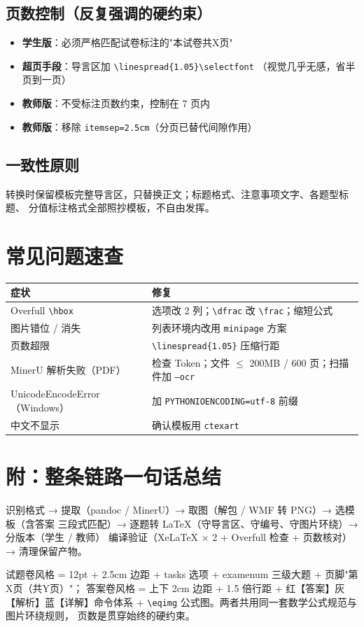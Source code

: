 \documentclass[11pt,a4paper]{ctexart}
\begin{document}
\subsection{页数控制（反复强调的硬约束）}

\begin{itemize}
  \item \textbf{学生版}：必须严格匹配试卷标注的"本试卷共X页"
  \item \textbf{超页手段}：导言区加 \texttt{\textbackslash linespread\{1.05\}\textbackslash selectfont}
        （视觉几乎无感，省半页到一页）
  \item \textbf{教师版}：不受标注页数约束，控制在 7 页内
  \item \textbf{教师版}：移除 \texttt{itemsep=2.5cm}（分页已替代间隙作用）
\end{itemize}

\subsection{一致性原则}

转换时保留模板完整导言区，只替换正文；标题格式、注意事项文字、各题型标题、
分值标注格式全部照抄模板，不自由发挥。

\section{常见问题速查}

\begin{center}
\begin{tabular}{ll}
\toprule
症状 & 修复 \\
\midrule
Overfull \texttt{\textbackslash hbox} & 选项改 2 列；\texttt{\textbackslash dfrac} 改 \texttt{\textbackslash frac}；缩短公式 \\
图片错位 / 消失 & 列表环境内改用 \texttt{minipage} 方案 \\
页数超限 & \texttt{\textbackslash linespread\{1.05\}} 压缩行距 \\
MinerU 解析失败（PDF） & 检查 Token；文件 $\leq$ 200MB / 600 页；扫描件加 \texttt{--ocr} \\
UnicodeEncodeError（Windows） & 加 \texttt{PYTHONIOENCODING=utf-8} 前缀 \\
中文不显示 & 确认模板用 \texttt{ctexart} \\
\bottomrule
\end{tabular}
\end{center}

\section*{附：整条链路一句话总结}

识别格式 → 提取（pandoc / MinerU）→ 取图（解包 / WMF 转 PNG）→ 选模板（含答案
三段式匹配）→ 逐题转 LaTeX（守导言区、守编号、守图片环绕）→ 分版本（学生 / 教师）
编译验证（XeLaTeX × 2 + Overfull 检查 + 页数核对）→ 清理保留产物。

试题卷风格 = 12pt + 2.5cm 边距 + tasks 选项 + examenum 三级大题 + 页脚"第X页（共Y页）"；
答案卷风格 = 上下 2cm 边距 + 1.5 倍行距 + 红【答案】灰【解析】蓝【详解】命令体系 +
\texttt{\textbackslash eqimg} 公式图。两者共用同一套数学公式规范与图片环绕规则，
页数是贯穿始终的硬约束。
\end{document}
